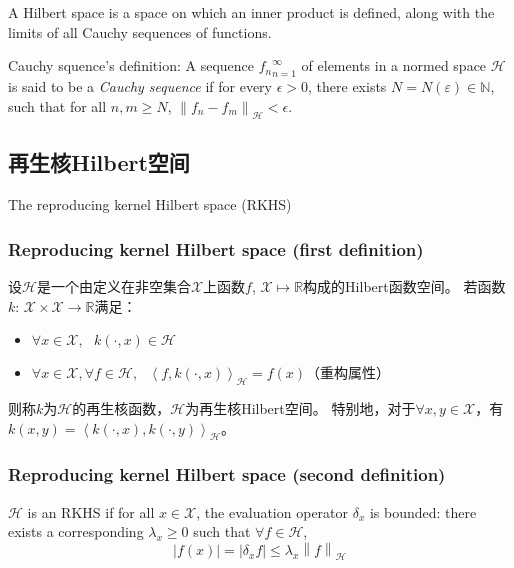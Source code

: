 \documentclass{ctexart}
\begin{document}
    A Hilbert space is a space on which an inner product is defined, along with the limits of all Cauchy sequences of functions.

    Cauchy squence's definition: A sequence ${f_n}_{n=1}^{\infty}$ of elements in a normed space $\mathcal{H}$ is said to be a \textit{Cauchy sequence} if for every $\epsilon > 0$,
    there exists $N = N(\varepsilon)\in \mathbb{N}$, such that for all $n, m\geq N$, $\left\lVert f_n - f_m\right\rVert_\mathcal{H} < \epsilon$. 
    

    \subsection{再生核Hilbert空间}
    The reproducing kernel Hilbert space (RKHS)

    \subsubsection{Reproducing kernel Hilbert space (first definition)}
    设$\mathcal{H}$是一个由定义在非空集合$\mathcal{X}$上函数$f$, $\mathcal{X}\mapsto \mathbb{R}$构成的Hilbert函数空间。
    若函数$k$: $\mathcal{X}\times\mathcal{X}\rightarrow \mathbb{R}$满足：
    \begin{itemize}
        \item $\forall x\in \mathcal{X}, \,\,\,\, k(\cdot, x)\in \mathcal{H}$
        \item $\forall x\in \mathcal{X}, \forall f\in \mathcal{H}, \,\,\,\, \left\langle f, k(\cdot, x)\right\rangle_{\mathcal{H}} = f(x)$（重构属性）
    \end{itemize}

    则称$k$为$\mathcal{H}$的再生核函数，$\mathcal{H}$为再生核Hilbert空间。
    特别地，对于$\forall x, y\in \mathcal{X}$，有$k(x, y) = \left\langle k(\cdot, x), k(\cdot, y)\right\rangle_{\mathcal{H}}$。

    \subsubsection{Reproducing kernel Hilbert space (second definition)}
    $\mathcal{H}$ is an RKHS if for all $x\in \mathcal{X}$, the evaluation operator $\delta_x$ is bounded: 
    there exists a corresponding $\lambda_x \geq 0$ such that $\forall f\in \mathcal{H}$,
    \begin{equation}
        \left\lvert f(x)\right\rvert = \left\lvert \delta_{x}f \right\rvert \leq \lambda_{x}\left\lVert f\right\rVert_{\mathcal{H}}  
    \end{equation}
\end{document}
